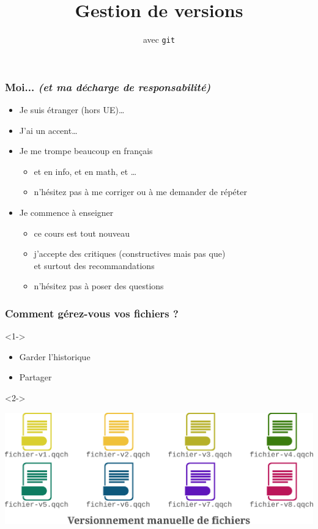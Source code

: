 \documentclass[table,tikz,12pt,svgnames]{beamer}
\title{\LARGE Gestion de versions}
\subtitle{avec \texttt{git}}
\date{}
\begin{document}
\begin{frame}
	\titlepage
\end{frame}

\begin{frame}
	\frametitle{Moi... \textit{\small (et ma décharge de responsabilité)}}
	\begin{itemize}
		\item Je suis étranger (hors UE)…
		\item J'ai un accent…
		\item Je me {\color{blue} trompe beaucoup} en français
		\begin{itemize}
			\item et en info, et en math, et \ldots
			\item n'hésitez pas à me corriger ou à me demander de répéter
		\end{itemize}
		\item Je commence à enseigner
		\begin{itemize}
			\item ce cours est tout nouveau
			\item j'accepte des critiques (constructives mais pas que)\\
			et surtout des recommandations
			\item n'hésitez pas à poser des questions
		\end{itemize}
	\end{itemize}
\end{frame}


\begin{frame}
	\frametitle{Comment gérez-vous vos fichiers ? }
	\vspace{-1em}
	\begin{block}{}<1->
	\begin{itemize}
		\item Garder l'historique
		\item Partager
	\end{itemize}
	\end{block}
	\vspace{-2em}
	\begin{block}{}<2->
    \begin{adjustwidth}{-0.5cm}{}
		\begin{center}	
		{\includegraphics[scale=0.5]{images/file_versions.pdf}}
		\end{center}
	\end{adjustwidth}
	\end{block}
\end{frame}
\end{document}
